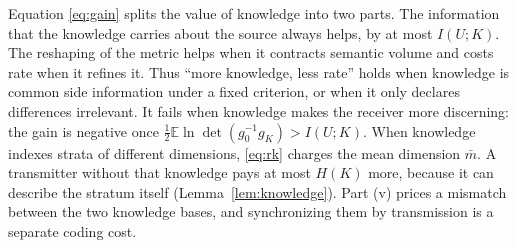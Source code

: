 \documentclass[10pt,journal]{IEEEtran}
\newcommand{\E}{\mathbb E}
\begin{document}
Equation \eqref{eq:gain} splits the value of knowledge into two parts. The information that the knowledge carries about the source always helps, by at most $I(U;K)$. The reshaping of the metric helps when it contracts semantic volume and costs rate when it refines it. Thus ``more knowledge, less rate'' holds when knowledge is common side information under a fixed criterion, or when it only declares differences irrelevant. It fails when knowledge makes the receiver more discerning: the gain is negative once $\frac12\E\ln\det(g_0^{-1}g_K)>I(U;K)$. When knowledge indexes strata of different dimensions, \eqref{eq:rk} charges the mean dimension $\bar m$. A transmitter without that knowledge pays at most $H(K)$ more, because it can describe the stratum itself (Lemma~\ref{lem:knowledge}). Part (v) prices a mismatch between the two knowledge bases, and synchronizing them by transmission is a separate coding cost.
\end{document}
